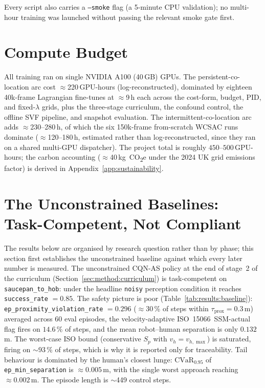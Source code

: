 \documentclass[11pt,a4paper]{report}
\newcommand{\ssm}{SSM}
\newcommand{\iso}{ISO~15066}
\newcommand{\cvar}{\ensuremath{\mathrm{CVaR}}}
\newcommand{\cqnas}{CQN-AS}
\begin{document}
\label{sec:setup:smoke}%
Every script also carries a \texttt{--smoke} flag (a 5-minute CPU
validation); no multi-hour training was launched without passing the
relevant smoke gate first.

\section{Compute Budget}
\label{sec:setup:compute}

All training ran on single NVIDIA A100 (40\,GB) GPUs. The
persistent-co-location arc cost $\approx$220\,GPU-hours
(log-reconstructed), dominated by eighteen 40k-frame Lagrangian
fine-tunes at $\approx$9\,h each across the cost-form, budget, PID,
and fixed-$\lambda$ grids, plus the three-stage curriculum, the
confound control, the offline SVF pipeline, and snapshot evaluation.
The intermittent-co-location arc adds $\approx$230--280\,h, of which
the six 150k-frame from-scratch WCSAC runs dominate
($\approx$120--180\,h, estimated rather than log-reconstructed,
since they ran on a shared multi-GPU dispatcher). The project total
is roughly $450$--$500$\,GPU-hours; the carbon accounting
($\approx$40\,kg~CO\textsubscript{2}e under the 2024 UK grid
emissions factor) is derived in Appendix~\ref{app:sustainability}.


\section{The Unconstrained Baselines: Task-Competent, Not Compliant}
\label{sec:results:baseline}

The results below are organised by research question rather than by
phase; this section first establishes the unconstrained baseline
against which every later number is measured. The unconstrained
\cqnas{} policy at the end of stage~2 of the
curriculum (Section~\ref{sec:method:curriculum}) is task-competent
on \texttt{saucepan\_to\_hob}: under the headline \texttt{noisy}
perception condition it reaches \texttt{success\_rate} $= 0.85$.
The safety picture is poor (Table~\ref{tab:results:baseline}):
\texttt{ep\_proximity\_violation\_rate} $= 0.296$ ($\approx$30\,\% of steps within $\tau_{\mathrm{prox}} =
0.3$\,m) averaged across 60 eval episodes, the velocity-adaptive
\iso{}~\ssm{}-actual flag fires on $14.6\,\%$ of steps, and the mean
robot--human separation is only $0.132$\,m. The worst-case ISO bound
(conservative $S_p$ with $v_h = v_{h,\max}$) is saturated, firing on
$\sim$93\,\% of steps, which is why it is reported only for
traceability. Tail behaviour is dominated by the human's closest
lunge: $\cvar_{0.95}$ of \texttt{ep\_min\_separation} is
$\approx 0.005$\,m, with the single worst approach reaching
$\approx 0.002$\,m. The episode length is $\sim$449 control steps.
\end{document}
